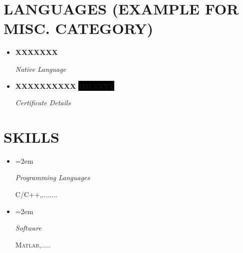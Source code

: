 \documentclass[paper=a4,fontsize=11pt]{scrartcl} %
\newlength{\spacebox}
\newcommand{\sepspace}{\vspace*{1em}}		%
\newcommand{\NewPart}[1]{\section*{\uppercase{#1}}}
\newcommand{\PersonalEntry}[2]{
		\noindent\hangindent=2em\hangafter=0 %
		\parbox{\spacebox}{        %
		\textit{#1}}		       %
		\hspace{1.5em} #2 \par}    %
\newcommand{\SkillsEntry}[2]{      %
		\noindent\hangindent=2em\hangafter=0 %
		\parbox{\spacebox}{        %
		\textit{#1}}			   %
		\hspace{1.5em} #2 \par}    %
\newcommand{\MiscEntry}[2]{
		\noindent \textbf{#1} \par      %
		\noindent \textit{#2} \par              %
		\normalsize \par}
\newcommand{\MiscEntryDate}[3]{
		\noindent \textbf{#1} \hfill      %
		\colorbox{Black}{\color{White}#2} \par  %
		\noindent \textit{#3} \par              %
		\normalsize \par}
\begin{document}
\NewPart{Languages (Example for Misc. Category)}

\begin{itemize}[leftmargin=*]
    \item \MiscEntry{XXXXXXX}{Native Language}
    \item \MiscEntryDate{XXXXXXXXXX}{\footnotesize MM.YYYY}{Certificate Details}
\end{itemize}
\sepspace





\NewPart{Skills}

\begin{itemize}
    \item[] \SkillsEntry{Programming Languages}{\textsc{C/C++},........}
    \item[] \SkillsEntry{Software}{\textsc{Matlab},.....}
\end{itemize}
\sepspace
\end{document}
